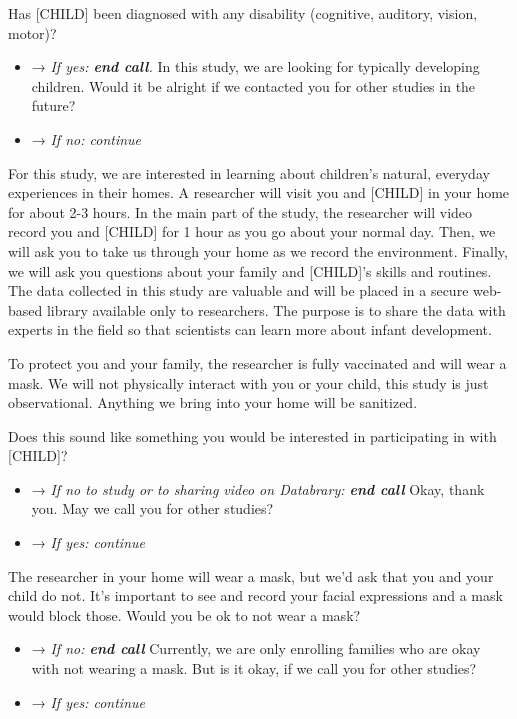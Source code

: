 \documentclass[
  12pt,
]{book}
\providecommand{\tightlist}{%
  \setlength{\itemsep}{0pt}\setlength{\parskip}{0pt}}
\begin{document}
Has {[}CHILD{]} been diagnosed with any disability (cognitive, auditory, vision, motor)?

\begin{itemize}
\tightlist
\item
  → \emph{If yes: \textbf{end call}.} In this study, we are looking for typically developing children. Would it be alright if we contacted you for other studies in the future?
\item
  → \emph{If no: continue}
\end{itemize}

For this study, we are interested in learning about children's natural, everyday experiences in their homes. A researcher will visit you and {[}CHILD{]} in your home for about 2-3 hours. In the main part of the study, the researcher will video record you and {[}CHILD{]} for 1 hour as you go about your normal day. Then, we will ask you to take us through your home as we record the environment. Finally, we will ask you questions about your family and {[}CHILD{]}'s skills and routines. The data collected in this study are valuable and will be placed in a secure web-based library available only to researchers. The purpose is to share the data with experts in the field so that scientists can learn more about infant development.

To protect you and your family, the researcher is fully vaccinated and will wear a mask. We will not physically interact with you or your child, this study is just observational. Anything we bring into your home will be sanitized.

Does this sound like something you would be interested in participating in with {[}CHILD{]}?

\begin{itemize}
\tightlist
\item
  → \emph{If no to study or to sharing video on Databrary: \textbf{end call} } Okay, thank you. May we call you for other studies?
\item
  → \emph{If yes: continue}
\end{itemize}

The researcher in your home will wear a mask, but we'd ask that you and your child do not. It's important to see and record your facial expressions and a mask would block those. Would you be ok to not wear a mask?

\begin{itemize}
\tightlist
\item
  → \emph{If no: \textbf{end call} } Currently, we are only enrolling families who are okay with not wearing a mask. But is it okay, if we call you for other studies?
\item
  → \emph{If yes: continue}
\end{itemize}
\end{document}
